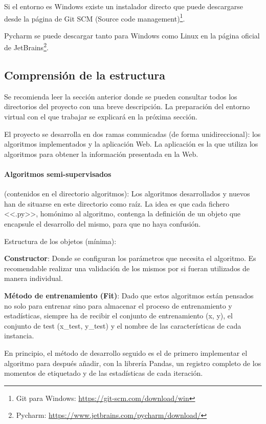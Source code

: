 Si el entorno es Windows existe un instalador directo que puede descargarse
desde la página de Git SCM (Source code management)\footnote{Git para Windows:
\url{https://git-scm.com/download/win}}.

Pycharm se puede descargar tanto para Windows como Linux en la página oficial de
JetBrains\footnote{Pycharm: \url{https://www.jetbrains.com/pycharm/download/}}.

\subsection{Comprensión de la estructura}

Se recomienda leer la sección anterior donde se pueden consultar todos los
directorios del proyecto con una breve descripción. La preparación del entorno
virtual con el que trabajar se explicará en la próxima sección.

El proyecto se desarrolla en dos ramas comunicadas (de forma unidireccional):
los algoritmos implementados y la aplicación Web. La aplicación es la que
utiliza los algoritmos para obtener la información presentada en la Web.

\paragraph{Algoritmos semi-supervisados} (contenidos en el directorio algoritmos):
Los algoritmos desarrollados y nuevos han de situarse en este directorio como
raíz. La idea es que cada fichero <<.py>>, homónimo al algoritmo, contenga la
definición de un objeto que encapsule el desarrollo del mismo, para que no haya
confusión.

Estructura de los objetos (mínima):

\textbf{Constructor}: Donde se configuran los parámetros que necesita el algoritmo. Es
recomendable realizar una validación de los mismos por si fueran utilizados de manera individual.

\textbf{Método de entrenamiento (Fit)}: Dado que estos algoritmos están pensados no solo
para entrenar sino para almacenar el proceso de entrenamiento y estadísticas,
siempre ha de recibir el conjunto de entrenamiento (x, y), el conjunto de test
(x\_test, y\_test) y el nombre de las características de cada instancia.

En principio, el método de desarrollo seguido es el de primero implementar el
algoritmo para después añadir, con la librería Pandas, un registro completo de
los momentos de etiquetado y de las estadísticas de cada iteración.

